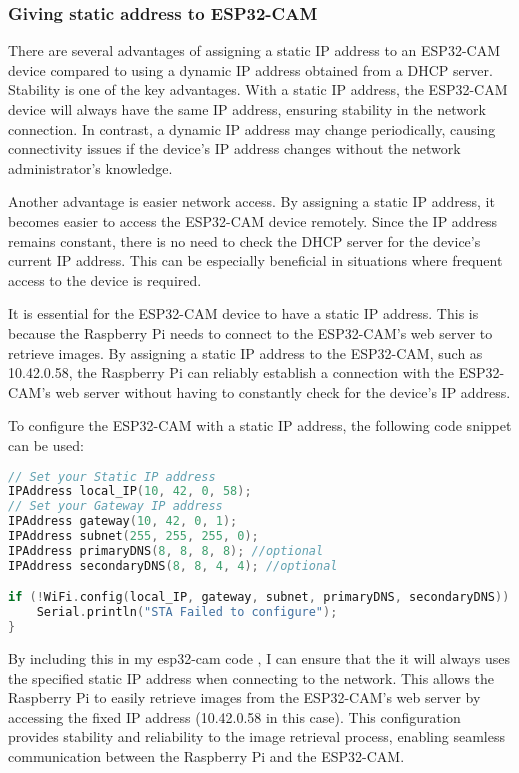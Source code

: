 \subsubsection{Giving static address to ESP32-CAM}
There are several advantages of assigning a static IP address to an ESP32-CAM device compared to using a dynamic IP address obtained from a DHCP server. Stability is one of the key advantages. With a static IP address, the ESP32-CAM device will always have the same IP address, ensuring stability in the network connection. In contrast, a dynamic IP address may change periodically, causing connectivity issues if the device's IP address changes without the network administrator's knowledge.

Another advantage is easier network access. By assigning a static IP address, it becomes easier to access the ESP32-CAM device remotely. Since the IP address remains constant, there is no need to check the DHCP server for the device's current IP address. This can be especially beneficial in situations where frequent access to the device is required.

It is essential for the ESP32-CAM device to have a static IP address. This is because the Raspberry Pi needs to connect to the ESP32-CAM's web server to retrieve images. By assigning a static IP address to the ESP32-CAM, such as 10.42.0.58, the Raspberry Pi can reliably establish a connection with the ESP32-CAM's web server without having to constantly check for the device's IP address.

To configure the ESP32-CAM with a static IP address, the following code snippet can be used:
\FloatBarrier
\begin{lstlisting}[language=C]
// Set your Static IP address
IPAddress local_IP(10, 42, 0, 58);
// Set your Gateway IP address
IPAddress gateway(10, 42, 0, 1);
IPAddress subnet(255, 255, 255, 0);
IPAddress primaryDNS(8, 8, 8, 8); //optional
IPAddress secondaryDNS(8, 8, 4, 4); //optional

if (!WiFi.config(local_IP, gateway, subnet, primaryDNS, secondaryDNS)) {
    Serial.println("STA Failed to configure");
}


\end{lstlisting}
By including this in my esp32-cam code , I can ensure that the it will always uses the specified static IP address when connecting to the network. This allows the Raspberry Pi to easily retrieve images from the ESP32-CAM's web server by accessing the fixed IP address (10.42.0.58 in this case). This configuration provides stability and reliability to the image retrieval process, enabling seamless communication between the Raspberry Pi and the ESP32-CAM.
